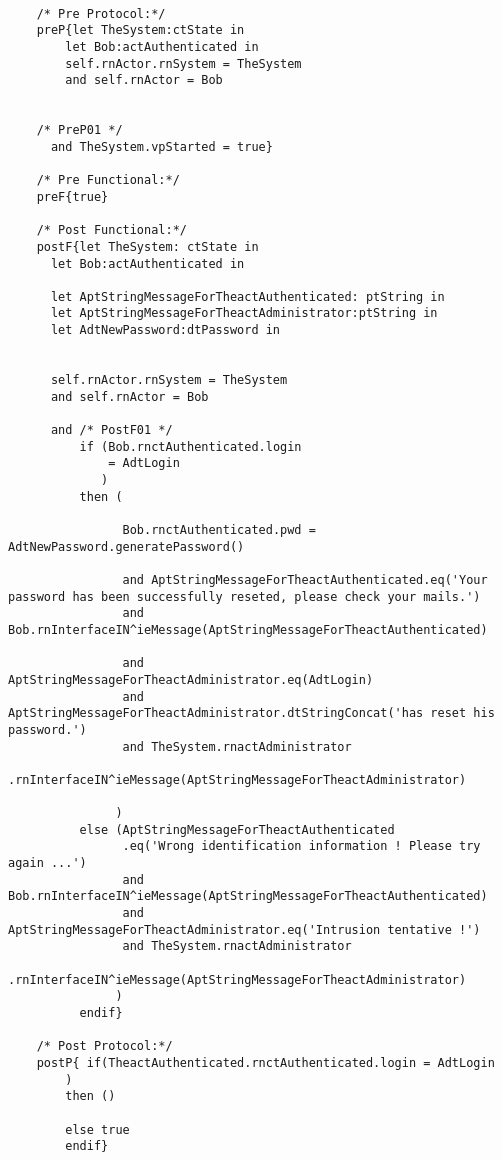 	\scriptsize
	\vspace{0.5cm}
	\begin{lstlisting}[style=MessirStyle,firstnumber=auto,captionpos=b,caption={\msrmessir (MCL-oriented) specification of the operation \emph{oeResetPassword}.},label=OM-actAuthenticated-oeResetPassword-MCL-LST]

	/* Pre Protocol:*/ 
	preP{let TheSystem:ctState in
		let Bob:actAuthenticated in
		self.rnActor.rnSystem = TheSystem
		and self.rnActor = Bob
		
		
	/* PreP01 */
	  and TheSystem.vpStarted = true}
	
	/* Pre Functional:*/
	preF{true}
	
	/* Post Functional:*/ 
	postF{let TheSystem: ctState in
	  let Bob:actAuthenticated in
	
	  let AptStringMessageForTheactAuthenticated: ptString in
	  let AptStringMessageForTheactAdministrator:ptString in
	  let AdtNewPassword:dtPassword in
	  
	  
	  self.rnActor.rnSystem = TheSystem
	  and self.rnActor = Bob
	  
	  and /* PostF01 */
	      if (Bob.rnctAuthenticated.login
	          = AdtLogin
	         )
	      then (
	      		
	      		Bob.rnctAuthenticated.pwd = AdtNewPassword.generatePassword()
	      		
	      	    and	AptStringMessageForTheactAuthenticated.eq('Your password has been successfully reseted, please check your mails.')
	            and Bob.rnInterfaceIN^ieMessage(AptStringMessageForTheactAuthenticated)
	            
	            and AptStringMessageForTheactAdministrator.eq(AdtLogin)
	            and AptStringMessageForTheactAdministrator.dtStringConcat('has reset his password.')
	            and TheSystem.rnactAdministrator
	                .rnInterfaceIN^ieMessage(AptStringMessageForTheactAdministrator)
			
	           )
	      else (AptStringMessageForTheactAuthenticated
	            .eq('Wrong identification information ! Please try again ...')
	            and Bob.rnInterfaceIN^ieMessage(AptStringMessageForTheactAuthenticated)
	            and AptStringMessageForTheactAdministrator.eq('Intrusion tentative !')
	            and TheSystem.rnactAdministrator
	                .rnInterfaceIN^ieMessage(AptStringMessageForTheactAdministrator)
	           )
	      endif}
	
	/* Post Protocol:*/ 
	postP{ if(TheactAuthenticated.rnctAuthenticated.login = AdtLogin
		)
		then ()
		
		else true
		endif}
	
	\end{lstlisting}
	\normalsize 
	
	
	
	






